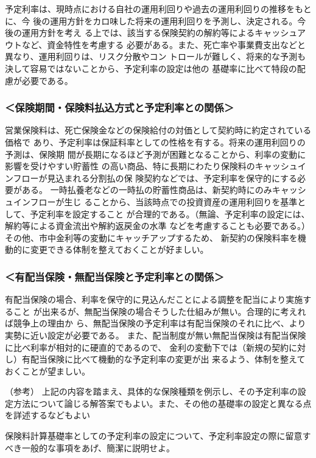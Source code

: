 \documentclass[report,gutter=10mm,fore-edge=10mm,uplatex,dvipdfmx]{jlreq}
\begin{document}
予定利率は、現時点における自社の運用利回りや過去の運用利回りの推移をもとに、今
後の運用方針をカロ味した将来の運用利回りを予測し、決定される。今後の運用方針を考え
る上では、該当する保険契約の解約等によるキャッシュアウトなど、資金特性を考慮する
必要がある。また、死亡率や事業費支出などと異なり、運用利回りは、リスク分散やコン
トロールが難しく、将来的な予測も決して容易ではないことから、予定利率の設定は他の
基礎率に比べて特段の配慮が必要である。

\subsubsection{＜保険期間・保険料払込方式と予定利率との関係＞}

営業保険料は、死亡保険金などの保険給付の対価として契約時に約定されている価格で
あり、予定利率は保証料率としての性格を有する。将来の運用利回りの予測は、保険期
間が長期になるほど予測が困難となることから、利率の変動に影響を受けやすい貯蓄性
の高い商品、特に長期にわたり保険料のキャッシュインフローが見込まれる分割払の保
険契約などでは、予定利率を保守的にする必要がある。
一時払養老などの一時払の貯蓄性商品は、新契約時にのみキャッシュインフローが生じ
ることから、当該時点での投資資産の運用利回りを基準として、予定利率を設定すること
が合理的である。（無論、予定利率の設定には、解約等による資金流出や解約返戻金の水準
などを考慮することも必要である。）その他、市中金利等の変動にキャッチアップするため、
新契約の保険料率を機動的に変更できる体制を整えておくことが好ましい。

\subsubsection{＜有配当保険・無配当保険と予定利率との関係＞}
有配当保険の場合、利率を保守的に見込んだことによる調整を配当により実施すること
が出来るが、無配当保険の場合そうした仕組みが無い。合理的に考えれば競争上の理由か
ら、無配当保険の予定利率は有配当保険のそれに比べ、より実勢に近い設定が必要である。
また、配当制度が無い無配当保険は有配当保険に比べ利率が相対的に硬直的であるので、
金利の変動下では（新規の契約に対し）有配当保険に比べて機動的な予定利率の変更が出
来るよう、体制を整えておくことが望ましい。

（参考）
上記の内容を踏まえ、具体的な保険種類を例示し、その予定利率の設定方法について論じる解答案でもよい。また、その他の基礎率の設定と異なる点を詳述するなどもよい



保険料計算基礎率としての予定利率の設定について、予定利率設定の際に留意すべき一般的な事項をあげ、簡潔に説明せよ。
\end{document}

